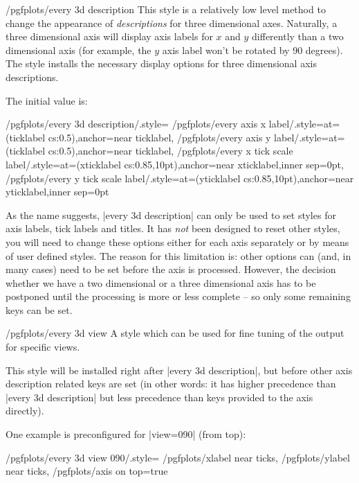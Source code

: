 \begin{stylekey}{/pgfplots/every 3d description}
	This style is a relatively low level method to change the appearance of \emph{descriptions} for three dimensional axes. Naturally, a three dimensional axis will display axis labels for $x$ and $y$ differently  than a two dimensional axis (for example, the $y$ axis label won't be rotated by 90 degrees). The  style installs the necessary display options for three dimensional axis descriptions.

	The initial value is:
\begin{codeexample}
/pgfplots/every 3d description/.style={
	/pgfplots/every axis x label/.style={at={(ticklabel cs:0.5)},anchor=near ticklabel},
	/pgfplots/every axis y label/.style={at={(ticklabel cs:0.5)},anchor=near ticklabel},
	/pgfplots/every x tick scale label/.style={at={(xticklabel cs:0.85,10pt)},anchor=near xticklabel,inner sep=0pt},
	/pgfplots/every y tick scale label/.style={at={(yticklabel cs:0.85,10pt)},anchor=near yticklabel,inner sep=0pt}
}%
\end{codeexample}

	As the name suggests, |every 3d description| can only be used to set styles for axis labels, tick labels and titles. It has \emph{not} been designed to reset other styles, you will need to change these options either for each axis separately or by means of user defined styles. The reason for this limitation is: other options can (and, in many cases) need to be set before the axis is processed. However, the decision whether we have a two dimensional or a three dimensional axis has to be postponed until the processing is more or less complete -- so only some remaining keys can be set.	
\end{stylekey}

\begin{stylekey}{/pgfplots/every 3d view }
	A style which can be used for fine tuning of the output for specific views.

	This style will be installed right after |every 3d description|, but before other axis description related keys are set (in other words: it has higher precedence than |every 3d description| but less precedence than keys provided to the axis directly).

	One example is preconfigured for |view={0}{90}| (from top):
\begin{codeexample}
/pgfplots/every 3d view {0}{90}/.style={
	/pgfplots/xlabel near ticks,
	/pgfplots/ylabel near ticks,
	/pgfplots/axis on top=true
}
\end{codeexample}
\end{stylekey}

